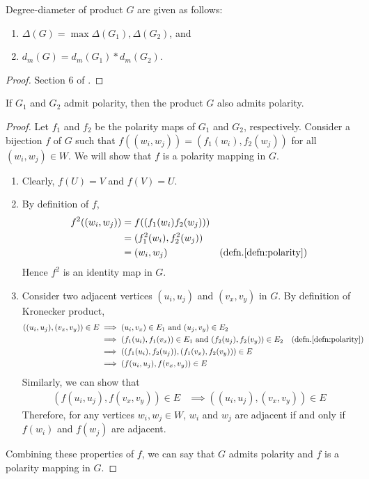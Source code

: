 \begin{claim}\label{claim:product}
Degree-diameter of product $G$ are given as follows:
\begin{enumerate}
\item$\Delta(G)=\max{\Delta(G_1), \Delta(G_2)}$, and
\item$d_{m}(G)=d_{m}(G_1)*d_{m}(G_2)$.
\end{enumerate}
\end{claim}
\begin{proof}
Section 6 of \cite{delorme1985large}.
\end{proof}


\begin{claim}\label{claim:product_polarity}
If $G_1$ and $G_2$ admit polarity, then the product $G$ also admits polarity.
\end{claim}
\begin{proof}
Let $f_1$ and $f_2$ be the polarity maps of $G_1$ 
and $G_2$, respectively. Consider a bijection $f$
of $G$ such that $f((w_i, w_j))=(f_1(w_i), f_2(w_j))$ for all $(w_i, w_j)\in W$. We will
show that $f$ is a polarity mapping in $G$.
\begin{enumerate}
    \item Clearly, $f(U)=V$ and $f(V)=U$.
    \item By definition of $f$, 
    \begin{align*}
        f^2((w_i, w_j)) & = f((f_1(w_i)f_2(w_j))) && \\
        & = (f_1^2(w_i),f_2^2(w_j)) && \\
        & = (w_i,w_j) && \textnormal{(defn.\ref{defn:polarity})}
    \end{align*} 
    Hence $f^2$ is an identity
    map in $G$.
    \item Consider two adjacent vertices $(u_i, u_j)$ and $(v_x, v_y)$ in $G$. By definition of
    Kronecker product,
    \begin{align*}
        ((u_i, u_j),(v_x, v_y))\in E &\implies (u_i, v_x)\in E_1 \text{ and } (u_j, v_y)\in E_2 \\
        &\implies (f_1(u_i), f_1(v_x))\in E_1 \text{ and } (f_2(u_j), f_2(v_y))\in E_2 && \text{(defn.\ref{defn:polarity})}\\
        &\implies ((f_1(u_i), f_2(u_j)), (f_1(v_x), f_2(v_y))) \in E\\
        &\implies (f(u_i, u_j), f(v_x, v_y))\in E
    \end{align*}
    Similarly, we can show that 
        \begin{align*}
            (f(u_i, u_j), f(v_x, v_y))\in E &\implies ((u_i, u_j),(v_x, v_y))\in E
        \end{align*}
    Therefore, for any vertices ${w_i, w_j}\in W$, $w_i$
and $w_j$ are adjacent if and only if $f(w_i)$ and $f(w_j)$ are adjacent. 
\end{enumerate}
Combining these properties of $f$, we can say that
$G$ admits polarity and $f$ is a polarity mapping in $G$.
\end{proof}

